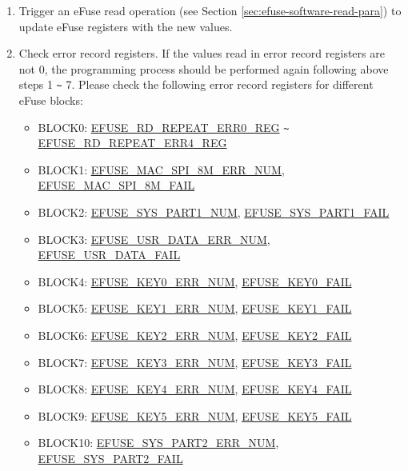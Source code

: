 \documentclass[main\_\_EN.tex]{subfiles}
\begin{document}
\begin{enumerate}
\item Trigger an eFuse read operation (see Section \ref{sec:efuse-software-read-para}) to update eFuse registers with the new values.
\item Check error record registers. If the values read in error record registers are not 0, the programming process should be performed again following above steps 1 \verb+~+ 7. Please check the following error record registers for different eFuse blocks:
\begin{itemize}
    \item BLOCK0: \hyperref[regdesc:EFUSERDREPEATERR0REG]{EFUSE\_RD\_REPEAT\_ERR0\_REG} \verb+~+ \hyperref[regdesc:EFUSERDREPEATERR4REG]{EFUSE\_RD\_REPEAT\_ERR4\_REG}
    \item BLOCK1: \hyperref[fielddesc:EFUSEMACSPI8MERRNUM] {EFUSE\_MAC\_SPI\_8M\_ERR\_NUM}, \hyperref[fielddesc:EFUSEMACSPI8MFAIL] {EFUSE\_MAC\_SPI\_8M\_FAIL}
    \item BLOCK2: \hyperref[fielddesc:EFUSESYSPART1NUM] {EFUSE\_SYS\_PART1\_NUM}, \hyperref[fielddesc:EFUSESYSPART1FAIL] {EFUSE\_SYS\_PART1\_FAIL}
    \item BLOCK3: \hyperref[fielddesc:EFUSEUSRDATAERRNUM] {EFUSE\_USR\_DATA\_ERR\_NUM}, \hyperref[fielddesc:EFUSEUSRDATAFAIL] {EFUSE\_USR\_DATA\_FAIL}
    \item BLOCK4: \hyperref[fielddesc:EFUSEKEY0ERRNUM] {EFUSE\_KEY0\_ERR\_NUM}, \hyperref[fielddesc:EFUSEKEY0FAIL] {EFUSE\_KEY0\_FAIL}
    \item BLOCK5: \hyperref[fielddesc:EFUSEKEY1ERRNUM] {EFUSE\_KEY1\_ERR\_NUM}, \hyperref[fielddesc:EFUSEKEY1FAIL] {EFUSE\_KEY1\_FAIL}
    \item BLOCK6: \hyperref[fielddesc:EFUSEKEY2ERRNUM] {EFUSE\_KEY2\_ERR\_NUM}, \hyperref[fielddesc:EFUSEKEY2FAIL] {EFUSE\_KEY2\_FAIL}
    \item BLOCK7: \hyperref[fielddesc:EFUSEKEY3ERRNUM] {EFUSE\_KEY3\_ERR\_NUM}, \hyperref[fielddesc:EFUSEKEY3FAIL] {EFUSE\_KEY3\_FAIL}
    \item BLOCK8: \hyperref[fielddesc:EFUSEKEY4ERRNUM] {EFUSE\_KEY4\_ERR\_NUM}, \hyperref[fielddesc:EFUSEKEY4FAIL] {EFUSE\_KEY4\_FAIL}
    \item BLOCK9: \hyperref[fielddesc:EFUSEKEY5ERRNUM] {EFUSE\_KEY5\_ERR\_NUM}, \hyperref[fielddesc:EFUSEKEY5FAIL] {EFUSE\_KEY5\_FAIL}
    \item BLOCK10: \hyperref[fielddesc:EFUSESYSPART2ERRNUM] {EFUSE\_SYS\_PART2\_ERR\_NUM}, \hyperref[fielddesc:EFUSESYSPART2FAIL] {EFUSE\_SYS\_PART2\_FAIL}
\end{itemize}
\end{enumerate}
\end{document}
